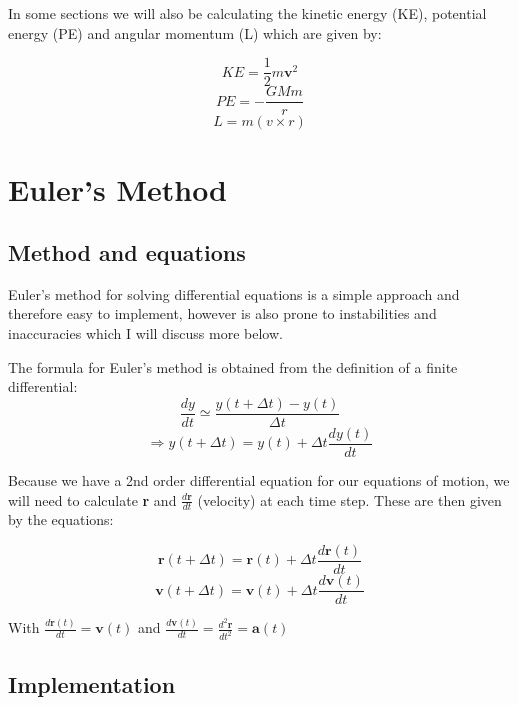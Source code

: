\documentclass[11pt]{article}
\begin{document}
In some sections we will also be calculating the kinetic energy (KE), potential energy (PE) and angular momentum (L) which are given by:

$$
KE = \frac{1}{2} m \textbf{v}^2
$$
$$
PE = - \frac{G M m}{r}
$$
$$
L = m (v \times r)
$$

\centering
\section{Euler's Method}
\raggedright
\subsection{Method and equations}

Euler's method for solving differential equations is a simple approach and therefore easy to implement, however is also prone to instabilities and inaccuracies which I will discuss more below. 
\bigskip

The formula for Euler's method is obtained from the definition of a finite differential:
\begin{equation}
\label{EulerDefinition1}
\frac{dy}{dt} \simeq \frac{y(t+\Delta t) - y(t)}{\Delta t} 
\end{equation}
\begin{equation}
\label{EulerDefinition2}
\Rightarrow y(t + \Delta t) = y(t) + \Delta t \frac{dy(t)}{dt}
\end{equation}

Because we have a 2nd order differential equation for our equations of motion, we will need to calculate \textbf{r} and $\frac{d\textbf{r}}{dt}$ (velocity) at each time step. These are then given by the equations:

$$
\textbf{r}(t+\Delta t)= \textbf{r}(t) + \Delta t \frac{d \textbf{r}(t)}{dt} 
$$
$$
\textbf{v}(t+\Delta t)= \textbf{v}(t) + \Delta t \frac{d \textbf{v}(t)}{dt} 
$$
\bigskip

With $\frac{d \textbf{r}(t)}{dt} = \textbf{v}(t)$ and  $\frac{d \textbf{v}(t)}{dt} = \frac{d^2\textbf{r}}{dt^2} = \textbf{a}(t)$


\subsection{Implementation}
\end{document}
